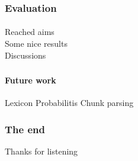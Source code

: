 \documentclass[10pt]{beamer}
\renewcommand{\baselinestretch}{1.5}
\begin{document}
%
%
%

\begin{frame}
 \renewcommand{\baselinestretch}{1.0}
\frametitle{Evaluation}
\framesubtitle{} 
Reached aims\\
Some nice results\\
Discussions\\
\end{frame}



\begin{frame}
 \renewcommand{\baselinestretch}{1.0}
\frametitle{}
\framesubtitle{Future work} 
Lexicon
Probabilitis
Chunk parsing
\end{frame}

\begin{frame}
    \frametitle{The end}
\large\begin{center}Thanks for listening\end{center}
\end{frame}
\end{document}
